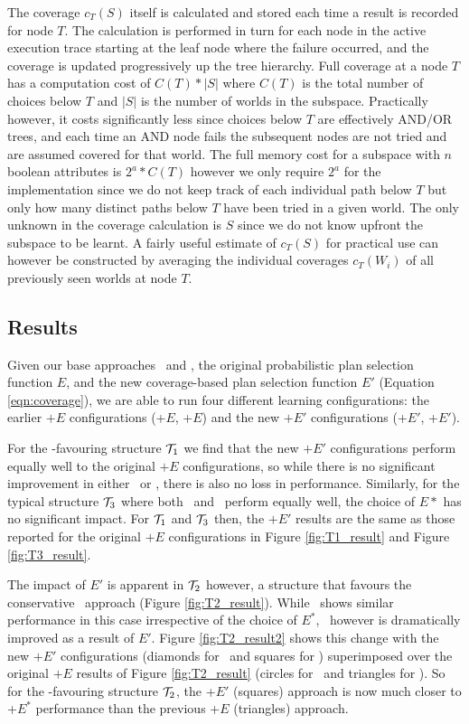 The coverage $c_T(S)$ itself is calculated and stored each time a result is recorded for node $T$. The calculation is performed in turn for each node in the active execution trace starting at the leaf node where the failure occurred, and the coverage is updated progressively up the tree hierarchy. Full coverage at a node $T$ has a computation cost of $C(T)*|S|$ where $C(T)$ is the total number of choices below $T$ and $|S|$ is the number of worlds in the subspace. Practically however, it costs significantly less since choices below $T$ are effectively AND/OR trees, and each time an AND node fails the subsequent nodes are not tried and are assumed covered for that world. The full memory cost for a subspace with $n$ boolean attributes is $2^a*C(T)$ however we only require $2^a$ for the implementation since we do not keep track of each individual path below $T$ but only how many distinct paths below $T$ have been tried in a given world. The only unknown in the coverage calculation is $S$ since we do not know upfront the subspace to be learnt. A fairly useful estimate of $c_T(S)$ for practical use can however be constructed by averaging the individual coverages $c_T(W_i)$ of all previously seen worlds at node $T$. 

\subsection{Results}

Given our base approaches \CL\ and \BUL, the original probabilistic plan selection function $E$, and the new coverage-based plan selection function $E'$ (Equation \ref{eqn:coverage}), we are able to run four different learning configurations: the earlier $+E$ configurations (\CL+$E$, \BUL+$E$) and the new $+E'$ configurations (\CL+$E'$, \BUL+$E'$).

For the \CL-favouring structure ${\mathcal{T}}_1$ we find that the new $+E'$ configurations perform equally well to the original $+E$ configurations, so while there is no significant improvement in either \CL\ or \BUL, there is also no loss in performance. Similarly, for the typical structure ${\mathcal{T}}_3$ where both \CL\ and \BUL\ perform equally well, the choice of $E*$ has no significant impact. For ${\mathcal{T}}_1$ and ${\mathcal{T}}_3$ then, the $+E'$ results are the same as those reported for the original $+E$ configurations in Figure \ref{fig:T1_result} and Figure \ref{fig:T3_result}.

The impact of $E'$ is apparent in ${\mathcal{T}}_2$ however, a structure that favours the conservative \BUL\ approach (Figure \ref{fig:T2_result}). While \BUL\ shows similar performance in this case irrespective of the choice of $E^*$, \CL\ however is dramatically improved as a result of $E'$. Figure \ref{fig:T2_result2} shows this change with the new $+E'$ configurations (diamonds for \BUL\ and squares for \CL) superimposed over the original $+E$ results of Figure \ref{fig:T2_result} (circles for \BUL\ and triangles for \CL). So for the \BUL-favouring structure ${\mathcal{T}}_2$, the \CL+$E'$ (squares) approach is now much closer to \BUL+$E^*$ performance than the previous \CL+$E$ (triangles) approach.

